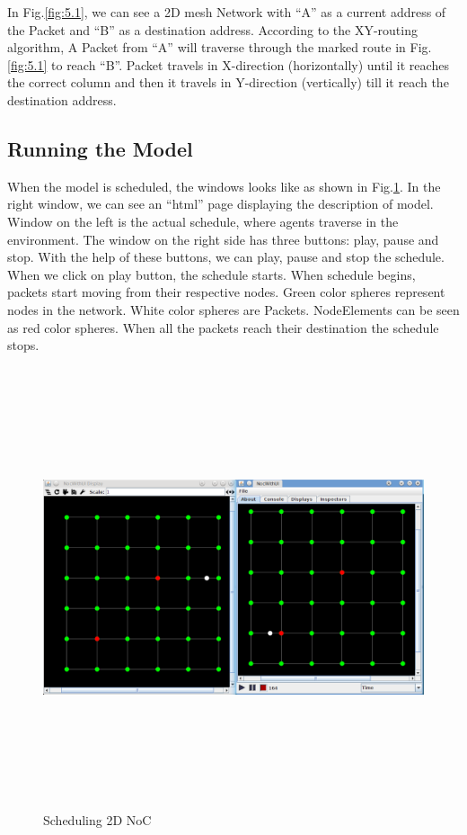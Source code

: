 In Fig.\ref{fig:5.1}, we can see a 2D mesh Network with ``A'' as a current address of the Packet and ``B'' as a destination address. According to the XY-routing algorithm, A Packet from ``A'' will traverse through the marked route in Fig.\ref{fig:5.1} to reach ``B''. Packet travels in X-direction (horizontally) until it reaches the correct column and then it travels in Y-direction (vertically) till it reach the destination address.

\subsection{Running the Model}

When the model is scheduled, the windows looks like as shown in Fig.\ref{fig:5.2}. In the right window, we can see an ``html'' page displaying the description of model. Window on the left is the actual schedule, where agents traverse in the environment. The window on the right side has three buttons: play, pause and stop. With the help of these buttons, we can play, pause and stop the schedule. When we click on play button, the schedule starts. When schedule begins, packets start moving from their respective nodes. Green color spheres represent nodes in the network. White color spheres are Packets. NodeElements can be seen as red color spheres. When all the packets reach their destination the schedule stops.
 
\begin{figure}[H]
\vspace{15 mm}
\flushleft
\includegraphics[height=5.1in, width=5.9in]{noc2d.eps}
\caption{Scheduling 2D NoC}
\label{fig:5.2}
\vspace{10 mm}
\end{figure} 

